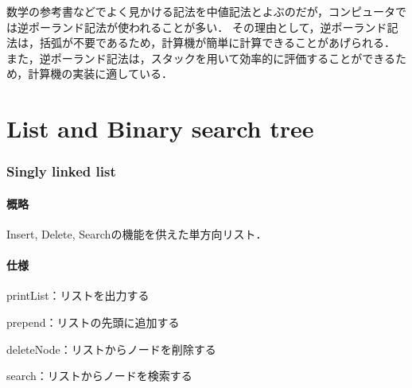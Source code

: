 \documentclass{ltjsarticle}
\begin{document}
数学の参考書などでよく見かける記法を中値記法とよぶのだが，コンピュータでは逆ポーランド記法が使われることが多い．
その理由として，逆ポーランド記法は，括弧が不要であるため，計算機が簡単に計算できることがあげられる．
また，逆ポーランド記法は，スタックを用いて効率的に評価することができるため，計算機の実装に適している．


\part{List and Binary search tree}

\section{Singly linked list}
\subsection{概略}
Insert, Delete, Searchの機能を供えた単方向リスト．

\subsection{仕様}
\noindent printList：リストを出力する

\noindent prepend：リストの先頭に追加する

\noindent deleteNode：リストからノードを削除する

\noindent search：リストからノードを検索する
\end{document}
